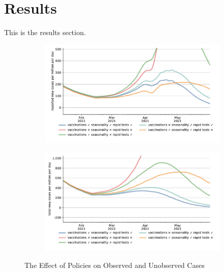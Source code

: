 \section{Results}
\label{sec:results}

This is the results section.

\begin{figure}[ht]
  \centering
  \begin{subfigure}{.6\textwidth}
    \includegraphics[width=0.9 \textwidth]{figures/results/figures/scenario_comparisons/one_off_and_combined/full_new_known_case_cropped}
  \end{subfigure}%
  \begin{subfigure}{.6\textwidth}
    \includegraphics[width=0.9 \textwidth]{figures/results/figures/scenario_comparisons/one_off_and_combined/full_newly_infected_cropped}
  \end{subfigure}
  \caption{The Effect of Policies on Observed and Unobserved Cases}
  \label{fig:explain_decline}
  \figurenotes{\ldots}
\end{figure}

